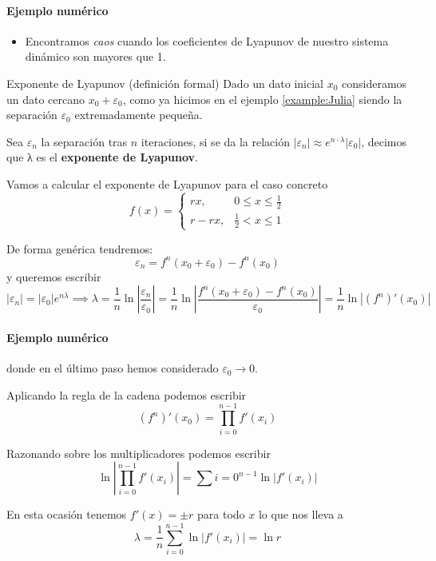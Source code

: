 \documentclass[8pt]{beamer}
\begin{document}
\begin{frame}
\framesubtitle{Ejemplo numérico}

\begin{itemize}
\item Encontramos \emph{caos} cuando los coeficientes de Lyapunov de nuestro sistema dinámico son mayores que 1.
\end{itemize}

\begin{block}{Exponente de Lyapunov (definición formal)}
Dado un dato inicial $x_0$ consideramos un dato cercano $x_0+ε_0$, como ya hicimos en el ejemplo \ref{example:Julia} siendo la separación $ε_0$ extremadamente pequeña.

Sea $ε_n$ la separación tras $n$ iteraciones, si se da la relación $|ε_n|\approx e^{n\cdot λ}|ε_0|$, decimos que λ es el \textbf{exponente de Lyapunov}.
\end{block}

\begin{example}
Vamos a calcular el exponente de Lyapunov para el caso concreto
\[f(x) = \left\{ \begin{array}{ll}
rx, & 0 \leq x \leq \frac{1}{2}\\
r-rx, & \frac{1}{2} < x \leq 1
\end{array}\right.\]

De forma genérica tendremos:
\[ε_n = f^n(x_0+ε_0)-f^n(x_0) \]
y queremos escribir
\[|ε_n| = |ε_0| e^{nλ} \implies λ = \frac{1}{n} \ln\left| \frac{ε_n}{ε_0}\right| = \frac{1}{n}\ln \left|\frac{f^n(x_0+ε_0)-f^n(x_0)}{ε_0} \right| = \frac{1}{n}\ln \left|(f^n)'(x_0) \right|\]
\end{example}
\end{frame}

\begin{frame}
\framesubtitle{Ejemplo numérico}
\begin{example}[Continuación]
donde en el último paso hemos considerado $ε_0 \to 0$.

Aplicando la regla de la cadena podemos escribir
\[(f^n)'(x_0) = \prod_{i=0}^{n-1}f'(x_i) \]

Razonando sobre los multiplicadores podemos escribir
\[\ln \left|\prod_{i=0}^{n-1}f'(x_i)\right| = \sum{i=0}^{n-1}\ln |f'(x_i)| \]

En esta ocasión tenemos $f'(x)=\pm r$ para todo $x$ lo que nos lleva a
\[λ= \frac{1}{n}\sum_{i=0}^{n-1}\ln |f'(x_i)| = \ln r\]
\end{example}
\end{frame}
\end{document}
